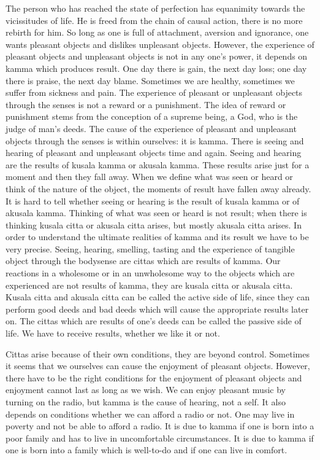 \documentclass{book}
\begin{document}
The person who has reached the state of perfection has equanimity
towards the vicissitudes of life. He is freed from the chain of causal
action, there is no more rebirth for him. So long as one is full of
attachment, aversion and ignorance, one wants pleasant objects and
dislikes unpleas­ant objects. However, the experience of pleasant
objects and unpleasant objects is not in any one's power, it depends on
kamma which produces result. One day there is gain, the next day loss;
one day there is praise, the next day blame. Sometimes we are healthy,
sometimes we suffer from sickness and pain. The experience of pleasant
or unpleasant objects through the senses is not a reward or a
punishment. The idea of reward or punishment stems from the conception
of a supreme being, a God, who is the judge of man's deeds. The cause of
the experience of pleasant and unpleasant objects through the senses is
within ourselves: it is kamma. There is seeing and hearing of pleasant
and unpleasant objects time and again. Seeing and hearing are the
results of kusala kamma or akusala kamma. These results arise just for a
moment and then they fall away. When we define what was seen or heard or
think of the nature of the object, the moments of result have fallen
away already. It is hard to tell whether seeing or hearing is the result
of kusala kamma or of akusala kamma. Thinking of what was seen or heard
is not result; when there is thinking kusala citta or akusala citta 
arises, but mostly akusala citta arises. In order to understand the ultimate realities of kamma and its result we have to be very precise. Seeing, hearing, smelling, tasting and the experience of tangible object through the bodysense are cittas which are results of kamma. Our 
reactions in a wholesome or in an unwholesome way to the objects which   are experienced are not results of kamma, they are kusala citta or    akusala citta. Kusala citta and akusala citta can be called the active  side of life, since they can perform good deeds and bad deeds which     will cause the appro­priate results later on. The cittas which are  results of one's deeds can be called the passive side of life. We have    to receive results, whether we like it or not.

Cittas arise because of their own conditions, they are beyond control.
Sometimes it seems that we ourselves can cause the enjoyment of pleasant
objects. However, there have to be the right conditions for the
enjoyment of pleasant objects and enjoyment cannot last as long as we
wish. We can enjoy pleasant music by turning on the radio, but kamma is
the cause of hearing, not a self. It also depends on conditions whether
we can afford a radio or not. One may live in poverty and not be able to
afford a radio. It is due to kamma if one is born into a poor family and
has to live in uncomfortable circumstances. It is due to kamma if one is
born into a family which is well-to-do and if one can live in comfort.
\end{document}
